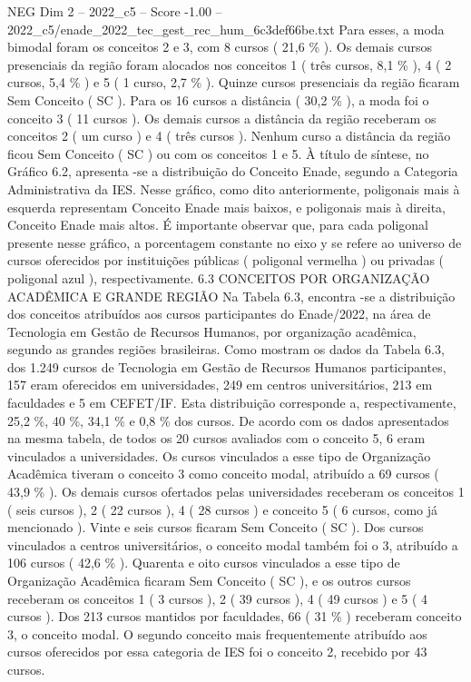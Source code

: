 \begin{textsample}{NEG Dim 2 – 2022\_c5 – Score -1.00 – 2022\_c5/enade\_2022\_tec\_gest\_rec\_hum\_6c3def66be.txt}
Para esses, a moda bimodal foram os conceitos 2 e 3, com 8 cursos ( 21,6 \% ).
Os demais cursos presenciais da região foram alocados nos conceitos 1 ( três cursos, 8,1 \% ), 4 ( 2 cursos, 5,4 \% ) e 5 ( 1 curso, 2,7 \% ).
Quinze cursos presenciais da região ficaram Sem Conceito ( SC ).
Para os 16 cursos a distância ( 30,2 \% ), a moda foi o conceito 3 ( 11 cursos ).
Os demais cursos a distância da região receberam os conceitos 2 ( um curso ) e 4 ( três cursos ).
Nenhum curso a distância da região ficou Sem Conceito ( SC ) ou com os conceitos 1 e 5.
À título de síntese, no Gráfico 6.2, apresenta -se a distribuição do Conceito Enade, segundo a Categoria Administrativa da IES.
Nesse gráfico, como dito anteriormente, poligonais mais à esquerda representam Conceito Enade mais baixos, e poligonais mais à direita, Conceito Enade mais altos.
É importante observar que, para cada poligonal presente nesse gráfico, a porcentagem constante no eixo y se refere ao universo de cursos oferecidos por instituições públicas ( poligonal vermelha ) ou privadas ( poligonal azul ), respectivamente. 6.3 CONCEITOS POR ORGANIZAÇÃO ACADÊMICA E GRANDE REGIÃO Na Tabela 6.3, encontra -se a distribuição dos conceitos atribuídos aos cursos participantes do Enade/2022, na área de Tecnologia em Gestão de Recursos Humanos, por organização acadêmica, segundo as grandes regiões brasileiras.
Como mostram os dados da Tabela 6.3, dos 1.249 cursos de Tecnologia em Gestão de Recursos Humanos participantes, 157 eram oferecidos em universidades, 249 em centros universitários, 213 em faculdades e 5 em CEFET/IF.
Esta distribuição corresponde a, respectivamente, 25,2 \%, 40 \%, 34,1 \% e 0,8 \% dos cursos.
De acordo com os dados apresentados na mesma tabela, de todos os 20 cursos avaliados com o conceito 5, 6 eram vinculados a universidades.
Os cursos vinculados a esse tipo de Organização Acadêmica tiveram o conceito 3 como conceito modal, atribuído a 69 cursos ( 43,9 \% ).
Os demais cursos ofertados pelas universidades receberam os conceitos 1 ( seis cursos ), 2 ( 22 cursos ), 4 ( 28 cursos ) e conceito 5 ( 6 cursos, como já mencionado ).
Vinte e seis cursos ficaram Sem Conceito ( SC ).
Dos cursos vinculados a centros universitários, o conceito modal também foi o 3, atribuído a 106 cursos ( 42,6 \% ).
Quarenta e oito cursos vinculados a esse tipo de Organização Acadêmica ficaram Sem Conceito ( SC ), e os outros cursos receberam os conceitos 1 ( 3 cursos ), 2 ( 39 cursos ), 4 ( 49 cursos ) e 5 ( 4 cursos ).
Dos 213 cursos mantidos por faculdades, 66 ( 31 \% ) receberam conceito 3, o conceito modal.
O segundo conceito mais frequentemente atribuído aos cursos oferecidos por essa categoria de IES foi o conceito 2, recebido por 43 cursos.

\end{textsample}
